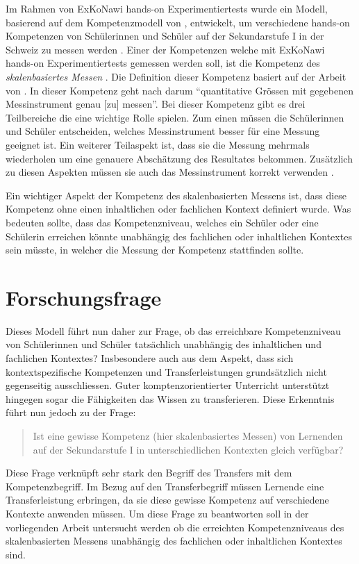 Im Rahmen von ExKoNawi hands-on Experimentiertests wurde ein Modell, basierend auf dem Kompetenzmodell von \citet{Gott1996},  entwickelt, um verschiedene hands-on Kompetenzen von Schülerinnen und Schüler auf der Sekundarstufe I in der Schweiz zu messen werden \citep{Metzger2013}. Einer der Kompetenzen welche mit ExKoNawi hands-on Experimentiertests gemessen werden soll, ist die Kompetenz des \textit{skalenbasiertes Messen} \citep{Gut2013a}. Die Definition dieser Kompetenz basiert auf der Arbeit von \citet{Munier2013}. In dieser Kompetenz geht nach \citep{Gut2013a} darum "`quantitative Grössen mit gegebenen Messinstrument genau [zu] messen"'. Bei dieser Kompetenz gibt es drei Teilbereiche die eine wichtige Rolle spielen. Zum einen müssen die Schülerinnen und Schüler entscheiden, welches Messinstrument besser für eine Messung geeignet ist. Ein weiterer Teilaspekt ist, dass sie die Messung mehrmals wiederholen um eine genauere Abschätzung des Resultates bekommen. Zusätzlich zu diesen Aspekten müssen sie auch das Messinstrument korrekt verwenden \citep{Munier2013,Gut2013a}.

Ein wichtiger Aspekt der Kompetenz des skalenbasierten Messens ist, dass diese Kompetenz ohne einen inhaltlichen oder fachlichen Kontext definiert wurde. Was bedeuten sollte, dass das Kompetenzniveau, welches ein Schüler oder eine Schülerin erreichen könnte unabhängig des fachlichen oder inhaltlichen Kontextes sein müsste, in welcher die Messung der Kompetenz stattfinden sollte.

\section{Forschungsfrage}

Dieses Modell führt nun daher zur Frage, ob das erreichbare Kompetenzniveau von Schüler\-innen und Schüler tatsächlich unabhängig des inhaltlichen und fachlichen Kontextes? Insbesondere auch aus dem Aspekt, dass sich kontextspezifische Kompetenzen und Transferleistungen grundsätzlich nicht gegenseitig ausschliessen. Guter komptenzorientierter Unterricht unterstützt hingegen sogar die Fähigkeiten das Wissen zu transferieren. Diese Erkenntnis führt nun jedoch zu der Frage: 
\begin{quote}
Ist eine gewisse Kompetenz (hier skalenbasiertes Messen) von Lernenden auf der Sekundarstufe I in unterschiedlichen Kontexten gleich verfügbar?
\end{quote}

Diese Frage verknüpft sehr stark den Begriff des Transfers mit dem Kompetenzbegriff. Im
Bezug auf den Transferbegriff müssen Lernende eine Transferleistung erbringen, da sie
diese gewisse Kompetenz auf verschiedene Kontexte anwenden müssen. Um diese Frage zu beantworten soll in der vorliegenden Arbeit untersucht werden ob die erreichten Kompetenzniveaus des skalenbasierten Messens unabhängig des fachlichen oder inhaltlichen Kontextes sind.




